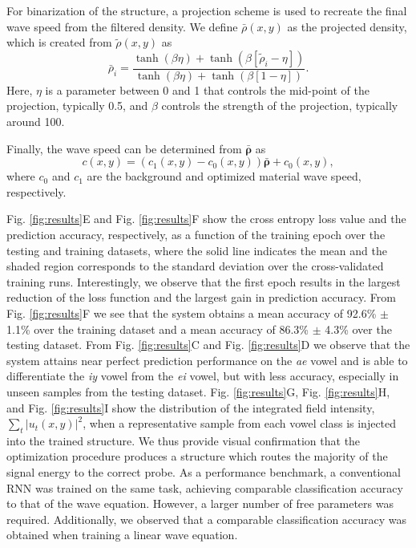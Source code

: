 For binarization of the structure, a projection scheme is used to recreate the final wave speed from the filtered density.  We define $\bar{\rho}(x,y)$ as the projected density, which is created from $\tilde{\rho}(x,y)$ as
\begin{equation}
\bar{\rho}_i = \frac{\tanh{\left( \beta \eta \right)} + \tanh{\left( \beta \left[ \tilde{\rho}_i - \eta \right] \right)}}{\tanh{\left( \beta \eta  \right)} + \tanh{\left( \beta \left[ 1 - \eta \right] \right)}}.
\end{equation}
Here, $\eta$ is a parameter between 0 and 1 that controls the mid-point of the projection, typically 0.5, and $\beta$ controls the strength of the projection, typically around 100.

Finally, the wave speed can be determined from $\bm{\bar{\rho}}$ as
\begin{equation}
c(x,y) = (c_1(x,y) - c_0(x,y))\bm{\bar{\rho}} + c_0(x,y),
\end{equation}
where $c_0$ and $c_1$ are the background and optimized material wave speed, respectively.



Fig. \ref{fig:results}E and Fig. \ref{fig:results}F show the cross entropy loss value and the prediction accuracy, respectively, as a function of the training epoch over the testing and training datasets, where the solid line indicates the mean and the shaded region corresponds to the standard deviation over the cross-validated training runs.
Interestingly, we observe that the first epoch results in the largest reduction of the loss function and the largest gain in prediction accuracy.
From Fig. \ref{fig:results}F we see that the system obtains a mean accuracy of 92.6\% $\pm$ 1.1\% over the training dataset and a mean accuracy of 86.3\% $\pm$ 4.3\% over the testing dataset.
From Fig. \ref{fig:results}C and Fig. \ref{fig:results}D we observe that the system attains near perfect prediction performance on the \textit{ae} vowel and is able to differentiate the \textit{iy} vowel from the \textit{ei} vowel, but with less accuracy, especially in unseen samples from the testing dataset. 
Fig. \ref{fig:results}G, Fig. \ref{fig:results}H, and Fig. \ref{fig:results}I show the distribution of the integrated field intensity, $\sum_t{\left\vert u_t{\left(x,y\right)} \right\vert^2}$, when a representative sample from each vowel class is injected into the trained structure. 
We thus provide visual confirmation that the optimization procedure produces a structure which routes the majority of the signal energy to the correct probe. 
As a performance benchmark, a conventional RNN was trained on the same task, achieving comparable classification accuracy to that of the wave equation. However, a larger number of free parameters was required.
Additionally, we observed that a comparable classification accuracy was obtained when training a linear wave equation.

